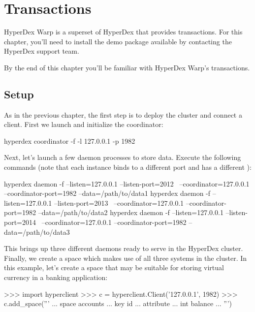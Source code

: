 \chapter{Transactions}
\label{chap:transactions}

HyperDex Warp is a superset of HyperDex that provides transactions.  For this
chapter, you'll need to install the  demo package available
by contacting the HyperDex support team.

By the end of this chapter you'll be familiar with HyperDex Warp's transactions.

\section{Setup}
\label{sec:transactions:setup}

As in the previous chapter, the first step is to deploy the cluster and connect
a client.   First we launch and initialize the coordinator:

\begin{consolecode}
hyperdex coordinator -f -l 127.0.0.1 -p 1982
\end{consolecode}

Next, let's launch a few daemon processes to store data.  Execute the following
commands (note that each instance binds to a different port and has a different
):

\begin{consolecode}
hyperdex daemon -f --listen=127.0.0.1 --listen-port=2012 \
                   --coordinator=127.0.0.1 --coordinator-port=1982 --data=/path/to/data1
hyperdex daemon -f --listen=127.0.0.1 --listen-port=2013 \
                   --coordinator=127.0.0.1 --coordinator-port=1982 --data=/path/to/data2
hyperdex daemon -f --listen=127.0.0.1 --listen-port=2014 \
                   --coordinator=127.0.0.1 --coordinator-port=1982 --data=/path/to/data3
\end{consolecode}

This brings up three different daemons ready to serve in the HyperDex cluster.
Finally, we create a space which makes use of all three systems in the cluster.
In this example, let's create a space that may be suitable for storing virtual
currency in a banking application:

\begin{pyconcode}
>>> import hyperclient
>>> c = hyperclient.Client('127.0.0.1', 1982)
>>> c.add_space('''
... space accounts
... key id
... attribute
...    int balance
... ''')
\end{pyconcode}

